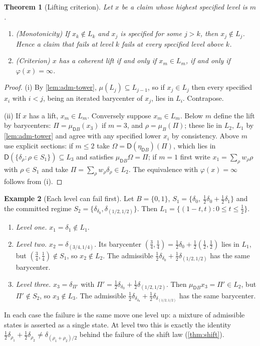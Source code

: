 \documentclass[11pt]{article}
\newtheorem{theorem}{Theorem}[section]
\theoremstyle{definition}
\newtheorem{example}[theorem]{Example}
\theoremstyle{remark}
\newcommand{\D}{\mathsf{D}}
\begin{document}
\begin{theorem}[Lifting criterion]\label{thm:lifting}
Let $x$ be a claim whose highest specified level is $m$.
\begin{enumerate}[label=(\roman*)]
\item (Monotonicity) If $x_k\notin L_k$ and $x_j$ is specified for some $j>k$, then $x_j\notin L_j$.
  Hence a claim that fails at level $k$ fails at every specified level above $k$.
\item (Criterion) $x$ has a coherent lift if and only if $x_m\in L_m$, if and only if
  $\varphi(x)=\infty$.
\end{enumerate}
\end{theorem}
\begin{proof}
(i) By \cref{lem:adm-tower}, $\mu(L_{j})\subseteq L_{j-1}$, so if $x_j\in L_j$ then every specified
$x_i$ with $i<j$, being an iterated barycenter of $x_j$, lies in $L_i$. Contrapose.

(ii) If $x$ has a lift, $x_m\in L_m$. Conversely suppose $x_m\in L_m$. Below $m$ define the lift by
barycenters: $\Pi=\mu_{\D B}(x_3)$ if $m=3$, and $\rho=\mu_B(\Pi)$; these lie in $L_2$, $L_1$ by
\cref{lem:adm-tower} and agree with any specified lower $x_i$ by consistency. Above $m$ use
explicit sections: if $m\le2$ take $\Omega=\D(\eta_{\D B})(\Pi)$, which lies in $\D(\{\delta_\rho:
\rho\in S_1\})\subseteq L_3$ and satisfies $\mu_{\D B}\Omega=\Pi$; if $m=1$ first write
$x_1=\sum_\rho w_\rho\rho$ with $\rho\in S_1$ and take $\Pi=\sum_\rho w_\rho\delta_\rho\in L_2$. The
equivalence with $\varphi(x)=\infty$ follows from (i).
\end{proof}

\begin{example}[Each level can fail first]\label{ex:failures}
Let $B=\{0,1\}$, $S_1=\{\delta_0,\ \tfrac12\delta_0+\tfrac12\delta_1\}$ and the committed regime
$S_2=\{\delta_{\delta_0},\delta_{(1/2,1/2)}\}$. Then $L_1=\{(1-t,t):0\le t\le\tfrac12\}$.
\begin{enumerate}[label=(\alph*)]
\item \emph{Level one.} $x_1=\delta_1\notin L_1$.
\item \emph{Level two.} $x_2=\delta_{(3/4,1/4)}$. Its barycenter $(\tfrac34,\tfrac14)=\tfrac12\delta_0+
  \tfrac12(\tfrac12,\tfrac12)$ lies in $L_1$, but $(\tfrac34,\tfrac14)\notin S_1$, so $x_2\notin L_2$.
  The admissible $\tfrac12\delta_{\delta_0}+\tfrac12\delta_{(1/2,1/2)}$ has the same barycenter.
\item \emph{Level three.} $x_3=\delta_{\Pi'}$ with $\Pi'=\tfrac12\delta_{\delta_0}+
  \tfrac12\delta_{(1/2,1/2)}$. Then $\mu_{\D B}x_3=\Pi'\in L_2$, but $\Pi'\notin S_2$, so $x_3\notin L_3$.
  The admissible $\tfrac12\delta_{\delta_{\delta_0}}+\tfrac12\delta_{\delta_{(1/2,1/2)}}$ has the same
  barycenter.
\end{enumerate}
In each case the failure is the same move one level up: a mixture of admissible states is asserted as
a single state. At level two this is exactly the identity
$\tfrac12\delta_{\rho_1}+\tfrac12\delta_{\rho_2}\neq\delta_{(\rho_1+\rho_2)/2}$ behind the failure of the
shift law (\cref{thm:shift}).
\end{example}
\end{document}
